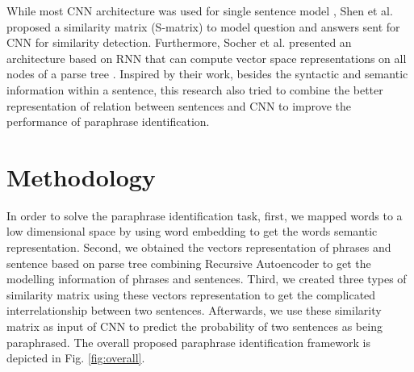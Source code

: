 \documentclass[conference]{IEEEtran}
\begin{document}


While most CNN architecture was used for single sentence model \cite{DBLP:conf/semeval/EyeciogluK16}, Shen et al. proposed a similarity matrix (S-matrix) \cite{DBLP:conf/aaai/ShenRSOX15} to model question and answers sent for CNN for similarity detection. Furthermore, Socher et al. presented an architecture based on RNN that can compute vector space representations on all nodes of a parse tree \cite{DBLP:conf/nips/SocherHPNM11}. Inspired by their work, besides the syntactic and semantic information within a sentence, this research also tried to combine the better representation of relation between sentences and CNN to improve the performance of paraphrase identification.



\section{Methodology}

In order to solve the paraphrase identification task, first, we mapped words to a low dimensional space by using word embedding to get the words semantic representation. Second, we obtained the vectors representation of phrases and sentence based on parse tree combining Recursive Autoencoder to get the modelling information of phrases and sentences. Third, we created three types of similarity matrix using these vectors representation to get the complicated interrelationship between two sentences. Afterwards, we use these similarity matrix as input of CNN to predict the probability of two sentences as being paraphrased. The overall proposed paraphrase identification framework is depicted in Fig. \ref{fig:overall}.
\end{document}
